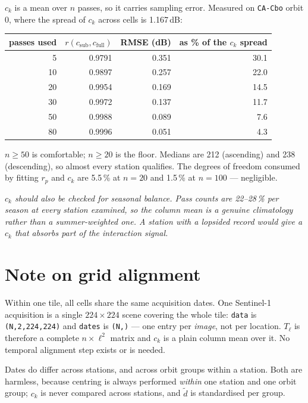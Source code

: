 \documentclass[10pt,a4paper]{article}
\newenvironment{quoting}%
  {\begin{list}{}{\setlength{\leftmargin}{1.4em}\setlength{\rightmargin}{1.4em}%
   \setlength{\topsep}{5pt}}\item[]\itshape}%
  {\end{list}}
\newcommand{\code}[1]{\texttt{\small #1}}
\begin{document}
$c_k$ is a mean over $n$ passes, so it carries sampling error. Measured on \code{CA-Cbo}
orbit 0, where the spread of $c_k$ across cells is 1.167\,dB:

\begin{center}\small
\begin{tabular}{rrrr}
\toprule
passes used & $r(c_{\text{sub}}, c_{\text{full}})$ & RMSE (dB) & as \% of the $c_k$ spread \\
\midrule
 5 & 0.9791 & 0.351 & 30.1 \\
10 & 0.9897 & 0.257 & 22.0 \\
20 & 0.9954 & 0.169 & 14.5 \\
30 & 0.9972 & 0.137 & 11.7 \\
50 & 0.9988 & 0.089 &  7.6 \\
80 & 0.9996 & 0.051 &  4.3 \\
\bottomrule
\end{tabular}
\end{center}

$n \ge 50$ is comfortable; $n \ge 20$ is the floor. Medians are 212 (ascending) and 238
(descending), so almost every station qualifies. The degrees of freedom consumed by fitting
$r_p$ and $c_k$ are 5.5\,\% at $n=20$ and 1.5\,\% at $n=100$ --- negligible.

\begin{quoting}
$c_k$ should also be checked for seasonal balance. Pass counts are 22--28\,\% per season at
every station examined, so the column mean is a genuine climatology rather than a
summer-weighted one. A station with a lopsided record would give a $c_k$ that absorbs part
of the interaction signal.
\end{quoting}

\section{Note on grid alignment}

Within one tile, all cells share the same acquisition dates. One Sentinel-1 acquisition is a
single $224\times224$ scene covering the whole tile: \code{data} is \code{(N,2,224,224)} and
\code{dates} is \code{(N,)} --- one entry per \emph{image}, not per location. $T_\ell$ is
therefore a complete $n \times \ell^2$ matrix and $c_k$ is a plain column mean over it. No
temporal alignment step exists or is needed.

Dates do differ across stations, and across orbit groups within a station. Both are
harmless, because centring is always performed \emph{within} one station and one orbit
group; $c_k$ is never compared across stations, and $\tilde d$ is standardised per group.
\end{document}
